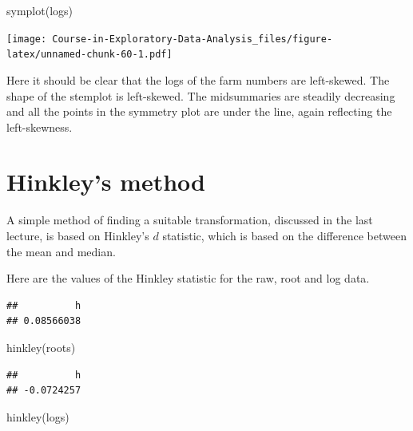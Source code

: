 \documentclass[
]{book}
\newenvironment{Shaded}{\begin{snugshade}}{\end{snugshade}}
\newcommand{\FunctionTok}[1]{\textcolor[rgb]{0.00,0.00,0.00}{#1}}
\newcommand{\NormalTok}[1]{#1}
\newcommand{\SpecialCharTok}[1]{\textcolor[rgb]{0.00,0.00,0.00}{#1}}
\begin{document}
\begin{Shaded}
\begin{Highlighting}[]
\FunctionTok{symplot}\NormalTok{(logs)}
\end{Highlighting}
\end{Shaded}

\texttt{[image: Course-in-Exploratory-Data-Analysis\_files/figure-latex/unnamed-chunk-60-1.pdf]}

Here it should be clear that the logs of the farm numbers are left-skewed. The shape of the stemplot is left-skewed. The midsummaries are steadily decreasing and all the points in the symmetry plot are under the line, again reflecting the left-skewness.

\hypertarget{hinkleys-method}{%
\section{Hinkley's method}\label{hinkleys-method}}

A simple method of finding a suitable transformation, discussed in the last lecture, is based on Hinkley's \(d\) statistic, which is based on the difference between the mean and median.

Here are the values of the Hinkley statistic for the raw, root and log data.

\begin{Shaded}
\end{Shaded}

\begin{verbatim}
##          h 
## 0.08566038
\end{verbatim}

\begin{Shaded}
\begin{Highlighting}[]
\FunctionTok{hinkley}\NormalTok{(roots)}
\end{Highlighting}
\end{Shaded}

\begin{verbatim}
##          h 
## -0.0724257
\end{verbatim}

\begin{Shaded}
\begin{Highlighting}[]
\FunctionTok{hinkley}\NormalTok{(logs)}
\end{Highlighting}
\end{Shaded}
\end{document}
